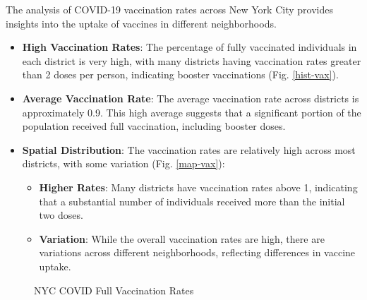 \documentclass[10pt,journal,compsoc]{IEEEtran}
\begin{document}
The analysis of COVID-19 vaccination rates across New York City provides insights into the uptake of vaccines in different neighborhoods.

\begin{itemize}
    \item \textbf{High Vaccination Rates}: The percentage of fully vaccinated individuals in each district is very high, with many districts having vaccination rates greater than 2 doses per person, indicating booster vaccinations (Fig. \ref{hist-vax}).
    \item \textbf{Average Vaccination Rate}: The average vaccination rate across districts is approximately 0.9. This high average suggests that a significant portion of the population received full vaccination, including booster doses.
    \item \textbf{Spatial Distribution}: The vaccination rates are relatively high across most districts, with some variation (Fig. \ref{map-vax}):
    \begin{itemize}
        \item \textbf{Higher Rates}: Many districts have vaccination rates above 1, indicating that a substantial number of individuals received more than the initial two doses.
        \item \textbf{Variation}: While the overall vaccination rates are high, there are variations across different neighborhoods, reflecting differences in vaccine uptake.
    \end{itemize}
\end{itemize}

\begin{figure}[t]
    \centering
    \caption{NYC COVID Full Vaccination Rates}
\end{figure}
\end{document}
